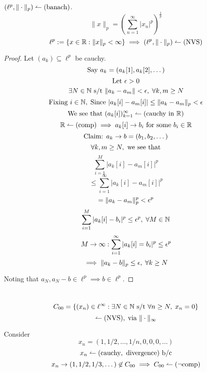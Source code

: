 \documentclass[12pt]{article}
\begin{document}
\bboxprop
\begin{prop}
    \((\ell^p,\|\cdot\|_p)\leftharpoonup(\mathrm{banach})\).
    \[
        \|x\|_p=\left(\sum_{n=1}^\infty|x_n|^p\right)^{\frac1p}
    \]
    \[
        \ell^p:=\{x\in\mathbb R:\|x\|_p<\infty\}\implies(\ell^p,\|\cdot\|_p)\leftharpoonup(\mathrm{NVS})
    \]
\end{prop}
\ebox

\bboxproof
\begin{proof}
    Let \((a_k)\subseteq\ell^p\) be cauchy.
    \[
        \text{Say }a_k=(a_k[1],a_k[2],\dots)
    \]
    \[
        \text{Let }\epsilon>0
    \]
    \[
        \exists N\in\mathbb N\text{ s/t }\|a_k-a_m\|<\epsilon,\;
        \forall k,m\ge N
    \]
    \[
        \text{Fixing }i\in\mathbb N,\;
        \text{Since }|a_k[i]-a_m[i]|\le\|a_k-a_m\|_p<\epsilon
    \]
    \[
        \text{We see that }(a_k[i])_{k=1}^\infty\leftharpoonup(\mathrm{cauchy\ in\ \mathbb R})
    \]
    \[
        \mathbb R\leftharpoonup(\mathrm{comp})\implies a_k[i]\to b_i\text{ for some }b_i\in\mathbb R
    \]
    \[
        \text{Claim: }a_k\to b=(b_1,b_2,\dots)
    \]
    \[
        \forall k,m\ge N,\text{ we see that}
    \]
    \[
        \sum_{i=1}^M|a_k[i]-a_m[i]|^p
    \]
    \[
        \le\sum_{i=1}^\infty|a_k[i]-a_m[i]|^p
    \]
    \[
        =\|a_k-a_m\|_p^p<\epsilon^p
    \]
    \[
        \sum^M_{i=1}|a_k[i]-b_i|^p\le\epsilon^p,\;\forall M\in\mathbb N
    \]
    \[
        M\to\infty:\sum_{i=1}^\infty|a_k[i]=b_i|^p\le\epsilon^p
    \]
    \[
        \implies\|a_k-b\|_p\le\epsilon,\;\forall k\ge N
    \]

    Noting that \(a_N,a_N-b\in\ell^p\implies b\in\ell^p\).
\end{proof}
\ebox

\bboxexam
\begin{exam}\
    \[
        C_{00}=\{(x_n)\in\ell^\infty:\exists N\in\mathbb N\text{ s/t }\forall n\ge N,\;x_n=0\}
    \]
    \[
        \leftharpoonup(\mathrm{NVS}),\;\text{via }\|\cdot\|_\infty
    \]

    Consider
    \[
        x_n=(1,1/2,\dots,1/n,0,0,0,\dots)
    \]
    \[
        x_n\leftharpoonup(\mathrm{cauchy,\ divergence})\text{ b/c}
    \]
    \[
        x_n\to(1,1/2,1/3,\dots)\not\in C_{00}\implies C_{00}\leftharpoonup(\mathrm{\neg comp})
    \]
\end{exam}
\ebox


\end{document}
